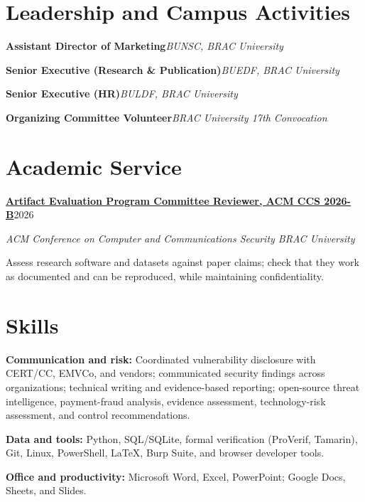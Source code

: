 \documentclass[10pt,a4paper]{article}
\begin{document}
\section*{Leadership and Campus Activities}
\textbf{Assistant Director of Marketing}\hfill {\color{muted}\textit{\textbar\enspace BUNSC, BRAC University}}\par
\textbf{Senior Executive (Research \& Publication)}\hfill {\color{muted}\textit{\textbar\enspace BUEDF, BRAC University}}\par
\textbf{Senior Executive (HR)}\hfill {\color{muted}\textit{\textbar\enspace BULDF, BRAC University}}\par
\textbf{Organizing Committee Volunteer}\hfill {\color{muted}\textit{\textbar\enspace BRAC University 17th Convocation}}\par
\section*{Academic Service}
\textbf{\href{https://ccs2026b-artifacts.hotcrp.com/users/pc}{Artifact Evaluation Program Committee Reviewer, ACM CCS 2026-B}}\hfill 2026\par
\textit{ACM Conference on Computer and Communications Security \enspace\textbar\enspace BRAC University}\par
Assess research software and datasets against paper claims; check that they work as documented and can be reproduced, while maintaining confidentiality.\par

\section*{Skills}
\textbf{Communication and risk:} Coordinated vulnerability disclosure with CERT/CC, EMVCo, and vendors; communicated security findings across organizations; technical writing and evidence-based reporting; open-source threat intelligence, payment-fraud analysis, evidence assessment, technology-risk assessment, and control recommendations.\par
\textbf{Data and tools:} Python, SQL/SQLite, formal verification (ProVerif, Tamarin), Git, Linux,
PowerShell, LaTeX, Burp Suite, and browser developer tools.\par
\vspace{1pt}
\textbf{Office and productivity:} Microsoft Word, Excel, PowerPoint; Google Docs, Sheets, and Slides.\par
\end{document}
